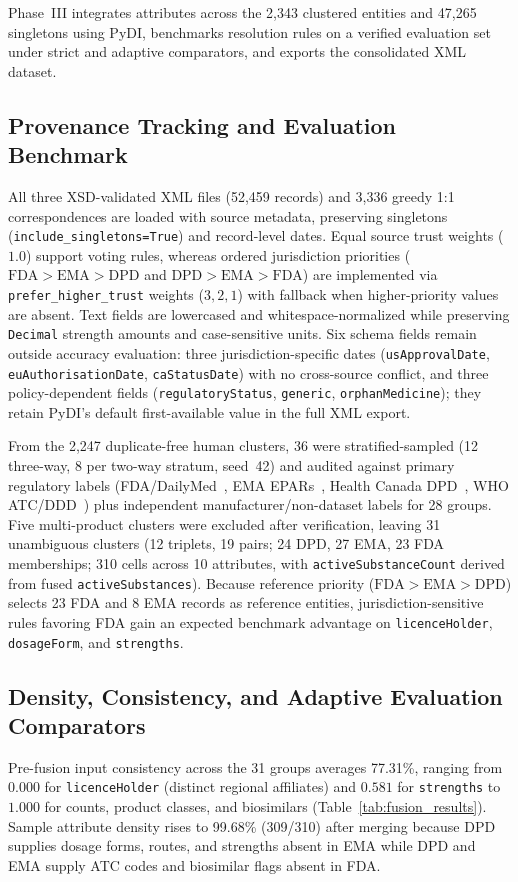 \documentclass{llncs}
\begin{document}
Phase~III integrates attributes across the 2,343 clustered entities and 47,265 singletons using PyDI, benchmarks resolution rules on a verified evaluation set under strict and adaptive comparators, and exports the consolidated XML dataset.

\subsection{Provenance Tracking and Evaluation Benchmark}
All three XSD-validated XML files (52,459 records) and 3,336 greedy 1:1 correspondences are loaded with source metadata, preserving singletons (\texttt{include\_singletons=True}) and record-level dates. Equal source trust weights ($1.0$) support voting rules, whereas ordered jurisdiction priorities ($\text{FDA}>\text{EMA}>\text{DPD}$ and $\text{DPD}>\text{EMA}>\text{FDA}$) are implemented via \texttt{prefer\_higher\_trust} weights ($3, 2, 1$) with fallback when higher-priority values are absent. Text fields are lowercased and whitespace-normalized while preserving \texttt{Decimal} strength amounts and case-sensitive units. Six schema fields remain outside accuracy evaluation: three jurisdiction-specific dates (\texttt{usApprovalDate}, \texttt{euAuthorisationDate}, \texttt{caStatusDate}) with no cross-source conflict, and three policy-dependent fields (\texttt{regulatoryStatus}, \texttt{generic}, \texttt{orphanMedicine}); they retain PyDI's default first-available value in the full XML export.

From the 2,247 duplicate-free human clusters, 36 were stratified-sampled (12 three-way, 8 per two-way stratum, seed~42) and audited against primary regulatory labels (FDA/DailyMed~\cite{fda_drugsatfda}, EMA EPARs~\cite{ema_medicines}, Health Canada DPD~\cite{healthcanada_dpd}, WHO ATC/DDD~\cite{whocc_atc}) plus independent manufacturer/non-dataset labels for 28 groups. Five multi-product clusters were excluded after verification, leaving 31 unambiguous clusters (12 triplets, 19 pairs; 24 DPD, 27 EMA, 23 FDA memberships; 310 cells across 10 attributes, with \texttt{activeSubstanceCount} derived from fused \texttt{activeSubstances}). Because reference priority ($\text{FDA}>\text{EMA}>\text{DPD}$) selects 23 FDA and 8 EMA records as reference entities, jurisdiction-sensitive rules favoring FDA gain an expected benchmark advantage on \texttt{licenceHolder}, \texttt{dosageForm}, and \texttt{strengths}.

\subsection{Density, Consistency, and Adaptive Evaluation Comparators}
Pre-fusion input consistency across the 31 groups averages 77.31\%, ranging from $0.000$ for \texttt{licenceHolder} (distinct regional affiliates) and $0.581$ for \texttt{strengths} to $1.000$ for counts, product classes, and biosimilars (Table~\ref{tab:fusion_results}). Sample attribute density rises to 99.68\% (309/310) after merging because DPD supplies dosage forms, routes, and strengths absent in EMA while DPD and EMA supply ATC codes and biosimilar flags absent in FDA.
\end{document}
